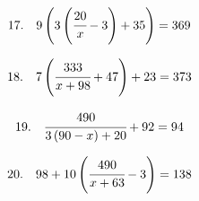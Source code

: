 \documentclass{article}
\begin{document}
\noindent
\begin{minipage}[t]{0.5000\textwidth}
\begin{align*}
17.\hspace{10pt}9\left(3\left(\cfrac{20}{x}-3\right)+35\right)&=369
\end{align*}
\end{minipage}
\begin{minipage}[t]{0.5000\textwidth}
\begin{align*}
18.\hspace{10pt}7\left(\cfrac{333}{x+98}+47\right)+23&=373
\end{align*}
\end{minipage}
\vspace{10 mm}

\noindent
\begin{minipage}[t]{0.5000\textwidth}
\begin{align*}
19.\hspace{10pt}\cfrac{490}{3\left(90-x\right)+20}+92&=94
\end{align*}
\end{minipage}
\begin{minipage}[t]{0.5000\textwidth}
\begin{align*}
20.\hspace{10pt}98+10\left(\cfrac{490}{x+63}-3\right)&=138
\end{align*}
\end{minipage}
\end{document}
